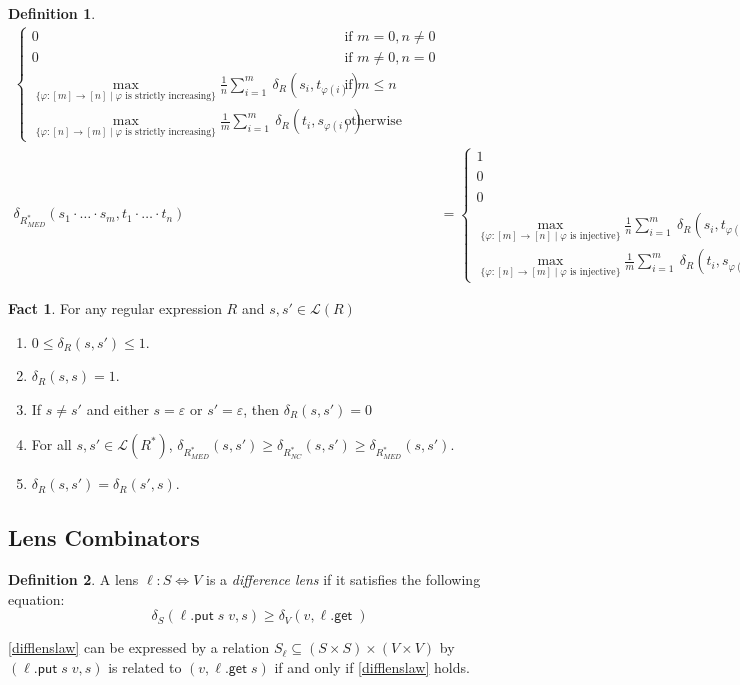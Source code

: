 \documentclass[acmsmall,review,anonymous]{acmart}\settopmatter{printfolios=true,printccs=false,printacmref=false}
\theoremstyle{definition}
\newtheorem{definition}{Definition}
\newtheorem{fact}{Fact}
\newcommand{\kw}[1]{\ensuremath{\mathsf{#1}}\xspace}
\newcommand{\get}{\ensuremath{\kw{get}}\xspace}
\newcommand{\pput}{\ensuremath{\kw{put}}\xspace}
\begin{document}
\begin{definition}
\begin{align*}
\begin{cases}
0 & \text{if } m = 0, n \neq 0\\
0 & \text{if } m \neq 0, n = 0\\
\max\limits_{\{\varphi : [m] \longrightarrow [n] \; | \; \varphi \text{ is strictly increasing}\}}\frac{1}{n}\sum\limits_{i=1}^{m}\ \delta_R(s_i, t_{\varphi(i)})& \text{if } m \leq n\\
\max\limits_{\{\varphi : [n] \longrightarrow [m] \; | \; \varphi \text{ is strictly increasing}\}}\frac{1}{m}\sum\limits_{i=1}^{m}\ \delta_R(t_i, s_{\varphi(i)})& \text{otherwise}
\end{cases}\\
\delta_{R^*_{MED}}(s_1 \cdot \ldots \cdot s_m, t_1 \cdot \ldots \cdot t_n) &= 
\begin{cases}
1 & \text{if } m = 0, n = 0\\ 
0 & \text{if } m = 0, n \neq 0\\
0 & \text{if } m \neq 0, n = 0\\\max\limits_{\{\varphi : [m] \longrightarrow [n] \; | \; \varphi \text{ is injective}\}}\frac{1}{n}\sum\limits_{i=1}^{m}\ \delta_R(s_i, t_{\varphi(i)})& \text{if } m \leq n\\
\max\limits_{\{\varphi : [n] \longrightarrow [m] \; | \; \varphi \text{ is injective}\}}\frac{1}{m}\sum\limits_{i=1}^{m}\ \delta_R(t_i, s_{\varphi(i)})& \text{otherwise}
\end{cases}
\end{align*}
\end{definition}
\begin{fact}
For any regular expression $R$ and $s, s' \in \mathcal{L}(R)$
\begin{enumerate}
\item
$0 \leq \delta_R(s, s') \leq 1$.
\item
$\delta_R(s, s) = 1$.
\item
If $s \neq s'$ and either $s = \varepsilon$ or $s' = \varepsilon$, then $\delta_R(s, s') = 0$
\item
For all $s, s' \in \mathcal{L}(R^*)$, $\delta_{R^*_{MED}}(s, s') \geq \delta_{R^*_{NC}}(s, s') \geq \delta_{R^*_{MED}}(s, s')$.
\item
$\delta_R(s, s') = \delta_R(s', s)$.
\end{enumerate}

\end{fact}
\subsection{Lens Combinators}
\begin{definition}
A lens $\ell : S \Leftrightarrow V$ is a {\em difference lens} if it satisfies the following equation:
\begin{equation}\label{difflenslaw}
\delta_S(\ell.\pput \; s \;v, s) \geq \delta_V(v, \ell.\get \; )
\end{equation}
\end{definition}
\cref{difflenslaw} can be expressed by a relation $S_{\ell} \subseteq (S \times S) \times (V \times V)$ by $(\ell.\pput \; s \;v, s)$ is related to $(v, \ell.\get \; s)$ if and only if \cref{difflenslaw} holds.
\end{document}
